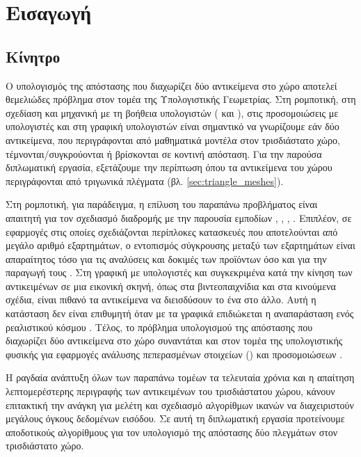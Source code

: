 \chapter{Εισαγωγή}
\label{ch:introduction}
\section{Κίνητρο}
Ο υπολογισμός της απόστασης που διαχωρίζει δύο αντικείμενα στο 
χώρο αποτελεί θεμελιώδες πρόβλημα στον τομέα της Υπολογιστικής
Γεωμετρίας.
Στη ρομποτική, στη σχεδίαση και μηχανική με τη βοήθεια υπολογιστών 
( και ), στις προσομοιώσεις με υπολογιστές και στη γραφική 
υπολογιστών είναι σημαντικό να γνωρίζουμε εάν δύο αντικείμενα, που περιγράφονται 
από μαθηματικά μοντέλα στον τρισδιάστατο χώρο, τέμνονται/συγκρούονται ή βρίσκονται 
σε κοντινή απόσταση.
Για την παρούσα διπλωματική εργασία, εξετάζουμε την περίπτωση όπου τα αντικείμενα
του χώρου περιγράφονται από τριγωνικά πλέγματα (βλ. \ref{sec:triangle_meshes}). 

Στη ρομποτική, για παράδειγμα, η επίλυση του παραπάνω προβλήματος 
είναι απαιτητή για τον σχεδιασμό διαδρομής με την παρουσία εμποδίων
\cite{brooks1985subdivision},
\cite{cameron1985study}, 
\cite{canny1986collision}, 
\cite{culley1986collision}.
Επιπλέον, σε εφαρμογές  στις οποίες σχεδιάζονται περίπλοκες 
κατασκευές που αποτελούνται από μεγάλο αριθμό εξαρτημάτων, ο εντοπισμός 
σύγκρουσης μεταξύ των εξαρτημάτων είναι απαραίτητος τόσο για τις αναλύσεις 
και δοκιμές των προϊόντων όσο και για την παραγωγή τους 
\cite{boyse1979interference}. 
Στη γραφική με υπολογιστές και συγκεκριμένα κατά την κίνηση των 
αντικειμένων σε μια εικονική σκηνή, όπως στα βιντεοπαιχνίδια και 
στα κινούμενα σχέδια, είναι πιθανό τα αντικείμενα να διεισδύσουν το 
ένα στο άλλο. Αυτή η κατάσταση δεν είναι επιθυμητή όταν με τα 
γραφικά επιδιώκεται η αναπαράσταση ενός ρεαλιστικού κόσμου
\cite{moore1988collision}.
Τέλος, το πρόβλημα υπολογισμού της απόστασης που διαχωρίζει δύο αντικείμενα 
στο χώρο συναντάται και στον τομέα της υπολογιστικής φυσικής για εφαρμογές 
ανάλυσης πεπερασμένων στοιχείων () και προσομοιώσεων 
\cite{khamayseh2007use}.

Η ραγδαία ανάπτυξη όλων των παραπάνω τομέων τα τελευταία χρόνια
και η απαίτηση λεπτομερέστερης περιγραφής των αντικειμένων του
τρισδιάστατου χώρου, κάνουν επιτακτική την ανάγκη για μελέτη
και σχεδιασμό αλγορίθμων ικανών να διαχειριστούν
μεγάλους όγκους δεδομένων εισόδου. Σε αυτή τη διπλωματική εργασία
προτείνουμε αποδοτικούς αλγορίθμους για τον υπολογισμό της απόστασης 
δύο πλεγμάτων στον τρισδιάστατο χώρο.

